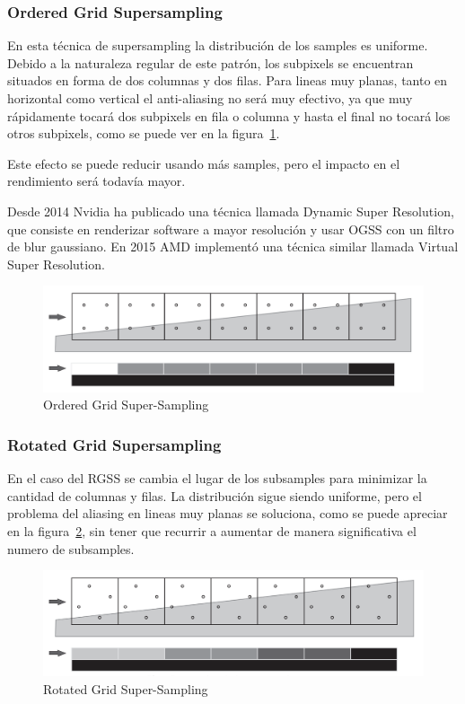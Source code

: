 \documentclass[withindex, glossary]{cam-thesis}
\begin{document}
\subsubsection{Ordered Grid Supersampling}

En esta técnica de supersampling la distribución de los samples es uniforme. Debido a la naturaleza regular de este patrón, los subpixels se encuentran situados en forma de dos columnas y dos filas. Para lineas muy planas, tanto en horizontal como vertical el anti-aliasing no será muy efectivo, ya que muy rápidamente tocará dos subpixels en fila o columna y hasta el final no tocará los otros subpixels, como se puede ver en la figura~\ref{ogss}.

Este efecto se puede reducir usando más samples, pero el impacto en el rendimiento será todavía mayor.

Desde 2014 Nvidia ha publicado una técnica llamada Dynamic Super Resolution\cite{960}, que consiste en renderizar software a mayor resolución y usar OGSS con un filtro de blur gaussiano. En 2015 AMD implementó una técnica similar llamada Virtual Super Resolution.

\begin{figure}[!htbp]
    \includegraphics[width=\linewidth]{figures/ogss.png}
    \caption{Ordered Grid Super-Sampling\cite{Beets2000SupersamplingAA}\label{ogss}}
\end{figure}

\subsubsection{Rotated Grid Supersampling}

En el caso del RGSS se cambia el lugar de los subsamples para minimizar la cantidad de columnas y filas. La distribución sigue siendo uniforme, pero el problema del aliasing en lineas muy planas se soluciona, como se puede apreciar en la figura~\ref{rgss}, sin tener que recurrir a aumentar de manera significativa el numero de subsamples.

\begin{figure}[!htbp]
    \includegraphics[width=\linewidth]{figures/rgss.png}
    \caption{Rotated Grid Super-Sampling\cite{Beets2000SupersamplingAA}\label{rgss}}
\end{figure}
\end{document}
